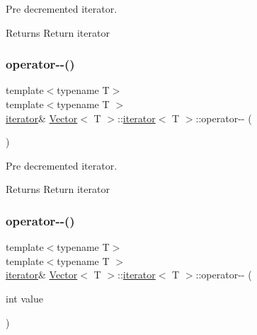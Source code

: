 Pre decremented iterator. 

\begin{DoxyReturn}{Returns}
Return iterator 
\end{DoxyReturn}
\mbox{\label{classVector_1_1iterator_a00fc1009bd761df83fd96b314d07d60d}} 
\subsubsection{\texorpdfstring{operator-\/-\/()}{operator--()}\hspace{0.1cm}{\footnotesize\ttfamily [2/4]}}
{\footnotesize\ttfamily template$<$typename T$>$ \\
template$<$typename T $>$ \\
\hyperlink{classVector_1_1iterator}{iterator}\& \hyperlink{classVector}{Vector}$<$ T $>$\+::\hyperlink{classVector_1_1iterator}{iterator}$<$ T $>$\+::operator-\/-\/ (\begin{DoxyParamCaption}{ }\end{DoxyParamCaption})\hspace{0.3cm}{\ttfamily [inline]}}



Pre decremented iterator. 

\begin{DoxyReturn}{Returns}
Return iterator 
\end{DoxyReturn}
\mbox{\label{classVector_1_1iterator_ab9fe4e94caea68d0460baebb6c224bb6}} 
\subsubsection{\texorpdfstring{operator-\/-\/()}{operator--()}\hspace{0.1cm}{\footnotesize\ttfamily [3/4]}}
{\footnotesize\ttfamily template$<$typename T$>$ \\
template$<$typename T $>$ \\
\hyperlink{classVector_1_1iterator}{iterator}\& \hyperlink{classVector}{Vector}$<$ T $>$\+::\hyperlink{classVector_1_1iterator}{iterator}$<$ T $>$\+::operator-\/-\/ (\begin{DoxyParamCaption}\item[{int}]{value }\end{DoxyParamCaption})\hspace{0.3cm}{\ttfamily [inline]}}



